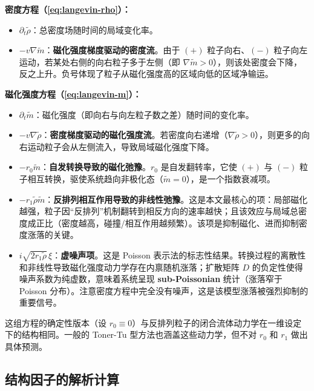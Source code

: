 \begin{remark}[各项物理意义逐项解读]
\textbf{密度方程（\ref{eq:langevin-rho}）：}
\begin{itemize}
    \item $\partial_t \tilde{\rho}$：总密度场随时间的局域变化率。
    \item $-v\nabla\tilde{m}$：\textbf{磁化强度梯度驱动的密度流}。由于 $(+)$ 粒子向右、$(-)$ 粒子向左运动，若某处右侧的向右粒子多于左侧（即 $\nabla\tilde{m}>0$），则该处密度会下降，反之上升。负号体现了粒子从磁化强度高的区域向低的区域净输运。
\end{itemize}

\textbf{磁化强度方程（\ref{eq:langevin-m}）：}
\begin{itemize}
    \item $\partial_t \tilde{m}$：磁化强度（即向右与向左粒子数之差）随时间的变化率。
    \item $-v\nabla\tilde{\rho}$：\textbf{密度梯度驱动的磁化强度流}。若密度向右递增（$\nabla\tilde{\rho}>0$），则更多的向右运动粒子会从左侧流入，导致局域磁化强度下降。
    \item $-r_0\tilde{m}$：\textbf{自发转换导致的磁化弛豫}。$r_0$ 是自发翻转率，它使 $(+)$ 与 $(-)$ 粒子相互转换，驱使系统趋向非极化态（$\tilde{m}=0$），是一个指数衰减项。
    \item $-r_1\tilde{\rho}\tilde{m}$：\textbf{反排列相互作用导致的非线性弛豫}。这是本文最核心的项：局部磁化越强，粒子因``反排列''机制翻转到相反方向的速率越快；且该效应与局域总密度成正比（密度越高，碰撞/相互作用越频繁）。该项是抑制磁化、进而抑制密度涨落的关键。
    \item $i\sqrt{2r_1\tilde{\rho}}\,\xi$：\textbf{虚噪声项}。这是 Poisson 表示法的标志性结果。转换过程的离散性和非线性导致磁化强度动力学存在内禀随机涨落；扩散矩阵 $D$ 的负定性使得噪声系数为纯虚数，意味着系统呈现 \textbf{sub-Poissonian} 统计（涨落窄于 Poisson 分布）。注意密度方程中完全没有噪声，这是该模型涨落被强烈抑制的重要信号。
\end{itemize}
\end{remark}

\begin{remark}[与已有文献的联系]
这组方程的确定性版本（设 $r_0 \equiv 0$）与反排列粒子的闭合流体动力学\cite{boltz2025}在一维设定下的结构相同。一般的 Toner-Tu 型方法\cite{toner1998}也涵盖这些动力学，但不对 $r_0$ 和 $r_1$ 做出具体预测。
\end{remark}

\subsection{结构因子的解析计算}\label{subsec:structure-factor}

